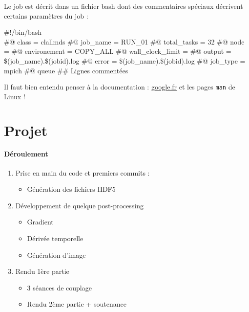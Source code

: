 \documentclass{article}
\begin{document}
Le job est décrit dans un fichier bash dont des commentaires spéciaux décrivent certains paramètres du job :\\
\begin{algorithm}[H]
\DontPrintSemicolon
\#!/bin/bash\\
\#@ class = clallmds 
\#@ job\_name = RUN\_01 
\#@ total\_tasks = 32 
\#@ node = 
\#@ environement = COPY\_ALL 
\#@ wall\_clock\_limit = 
\#@ output = \$(job\_name).\$(jobid).log 
\#@ error = \$(job\_name).\$(jobid).log 
\#@ job\_type = mpich 
\#@ queue 
\#\# Lignes commentées
\end{algorithm}

Il faut bien entendu penser à la documentation : \url{google.fr} et les pages \texttt{man} de Linux !

\section{Projet}
\paragraph{Déroulement}
\begin{enumerate}
\item Prise en main du code et premiers commits :
\begin{itemize}
\item Génération des fichiers HDF5
\end{itemize}
\item Développement de quelque post-processing
\begin{itemize}
\item Gradient
\item Dérivée temporelle
\item Génération d'image
\end{itemize}
\item Rendu 1ère partie
\begin{itemize}
\item 3 séances de couplage
\item Rendu 2ème partie + soutenance
\end{itemize}
\end{enumerate}
\end{document}
